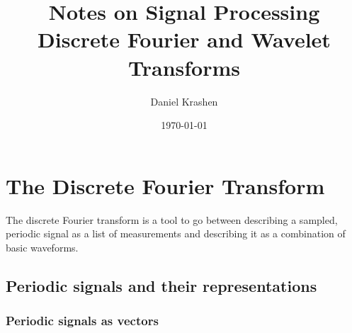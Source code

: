 \documentclass[12pt]{report}
\theoremstyle{plain}
\begin{document}


\author{Daniel Krashen}
\title{Notes on Signal Processing\\Discrete Fourier and Wavelet Transforms}
\date{\today}

\maketitle
\tableofcontents

\chapter{The Discrete Fourier Transform}

The discrete Fourier transform is a tool to go between describing a sampled, periodic signal as a list of measurements and describing it as a combination of basic waveforms.

\section{Periodic signals and their representations}

\subsection{Periodic signals as vectors}
\end{document}
